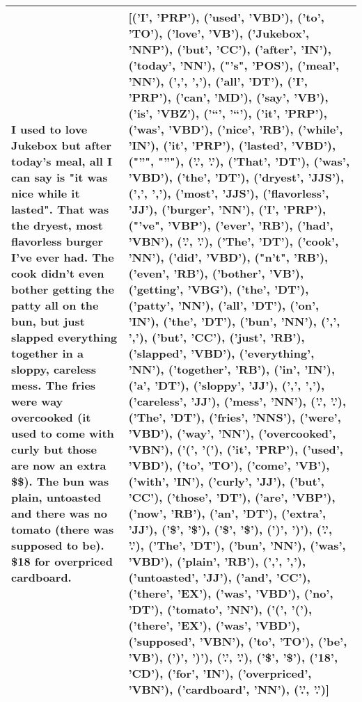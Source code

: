 \begin{longtable}{| p{3cm} | p{3cm} |}
         \hline
         I used to love Jukebox but after today's meal, all I can say is "it was nice while it lasted". That was the dryest, most flavorless burger I've ever had. The cook didn't even bother getting the patty all on the bun, but just slapped everything together in a sloppy, careless mess. The fries were way overcooked (it used to come with curly but those are now an extra \$\$). The bun was plain, untoasted and there was no tomato (there was supposed to be). \$18 for overpriced cardboard. & [('I', 'PRP'), ('used', 'VBD'), ('to', 'TO'), ('love', 'VB'), ('Jukebox', 'NNP'), ('but', 'CC'), ('after', 'IN'), ('today', 'NN'), ("'s", 'POS'), ('meal', 'NN'), (',', ','), ('all', 'DT'), ('I', 'PRP'), ('can', 'MD'), ('say', 'VB'), ('is', 'VBZ'), ('``', '``'), ('it', 'PRP'), ('was', 'VBD'), ('nice', 'RB'), ('while', 'IN'), ('it', 'PRP'), ('lasted', 'VBD'), ("''", "''"), ('.', '.'), ('That', 'DT'), ('was', 'VBD'), ('the', 'DT'), ('dryest', 'JJS'), (',', ','), ('most', 'JJS'), ('flavorless', 'JJ'), ('burger', 'NN'), ('I', 'PRP'), ("'ve", 'VBP'), ('ever', 'RB'), ('had', 'VBN'), ('.', '.'), ('The', 'DT'), ('cook', 'NN'), ('did', 'VBD'), ("n't", 'RB'), ('even', 'RB'), ('bother', 'VB'), ('getting', 'VBG'), ('the', 'DT'), ('patty', 'NN'), ('all', 'DT'), ('on', 'IN'), ('the', 'DT'), ('bun', 'NN'), (',', ','), ('but', 'CC'), ('just', 'RB'), ('slapped', 'VBD'), ('everything', 'NN'), ('together', 'RB'), ('in', 'IN'), ('a', 'DT'), ('sloppy', 'JJ'), (',', ','), ('careless', 'JJ'), ('mess', 'NN'), ('.', '.'), ('The', 'DT'), ('fries', 'NNS'), ('were', 'VBD'), ('way', 'NN'), ('overcooked', 'VBN'), ('(', '('), ('it', 'PRP'), ('used', 'VBD'), ('to', 'TO'), ('come', 'VB'), ('with', 'IN'), ('curly', 'JJ'), ('but', 'CC'), ('those', 'DT'), ('are', 'VBP'), ('now', 'RB'), ('an', 'DT'), ('extra', 'JJ'), ('\$', '\$'), ('\$', '\$'), (')', ')'), ('.', '.'), ('The', 'DT'), ('bun', 'NN'), ('was', 'VBD'), ('plain', 'RB'), (',', ','), ('untoasted', 'JJ'), ('and', 'CC'), ('there', 'EX'), ('was', 'VBD'), ('no', 'DT'), ('tomato', 'NN'), ('(', '('), ('there', 'EX'), ('was', 'VBD'), ('supposed', 'VBN'), ('to', 'TO'), ('be', 'VB'), (')', ')'), ('.', '.'), ('\$', '\$'), ('18', 'CD'), ('for', 'IN'), ('overpriced', 'VBN'), ('cardboard', 'NN'), ('.', '.')] \\
         \hline

\end{longtable}
